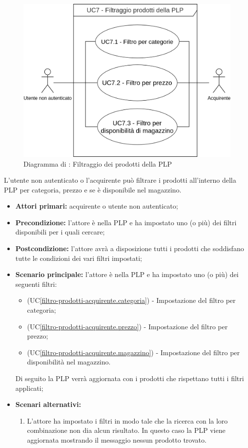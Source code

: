 \begin{figure}[H]
    \centering
    \includegraphics[scale=0.9]{Immagini/DiagrammiUC/Acquirente/FiltraggioProdotti.png}
    \caption{Diagramma di \actualUC: Filtraggio dei prodotti della PLP}
    \label{fig:filtro-prodotti-acquirente}
\end{figure}

L'utente non autenticato o l'acquirente può filtrare i prodotti all'interno della PLP per categoria, prezzo e se è disponibile nel magazzino.
\begin{itemize}
    \item \textbf{Attori primari:} acquirente o utente non autenticato;
    \item \textbf{Precondizione:} l'attore è nella PLP e ha impostato uno (o più) dei filtri disponibili per i quali cercare;
    \item \textbf{Postcondizione:} l'attore avrà a disposizione tutti i prodotti che soddisfano tutte le condizioni dei vari filtri impostati;
    \item \textbf{Scenario principale:} l'attore è nella PLP e ha impostato uno (o più) dei seguenti filtri:
    \begin{itemize}
        \item (UC\ref{filtro-prodotti-acquirente.categoria}) - Impostazione del filtro per categoria;
        \item (UC\ref{filtro-prodotti-acquirente.prezzo}) - Impostazione del filtro per prezzo;
        \item (UC\ref{filtro-prodotti-acquirente.magazzino}) - Impostazione del filtro per disponibilità nel magazzino.
    \end{itemize}
    Di seguito la PLP verrà aggiornata con i prodotti che rispettano tutti i filtri applicati;
    \item \textbf{Scenari alternativi:}
    \begin{enumerate}[label=\lett]
        \item L'attore ha impostato i filtri in modo tale che la ricerca con la loro combinazione non dia alcun risultato. In questo caso la PLP viene aggiornata mostrando il messaggio nessun prodotto trovato.
    \end{enumerate}
\end{itemize}

